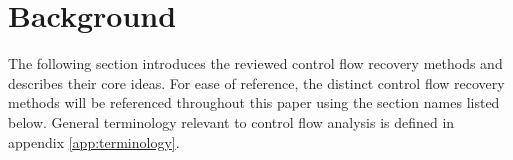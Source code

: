 
\section{Background}

The following section introduces the reviewed control flow recovery methods and describes their core ideas. For ease of reference, the distinct control flow recovery methods will be referenced throughout this paper using the section names listed below. General terminology relevant to control flow analysis is defined in appendix \ref{app:terminology}.



\clearpage

\clearpage

%
